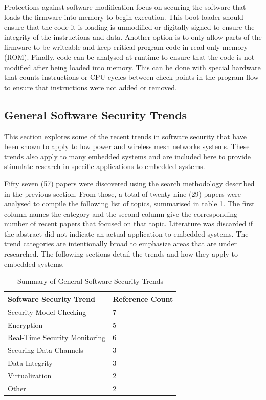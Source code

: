 \documentclass[final,conference,10pt]{IEEEtran}
\begin{document}
Protections against software modification focus on securing the software that loads the firmware into memory to begin execution.  This boot loader should ensure that the code it is loading is unmodified or digitally signed to ensure the integrity of the instructions and data. Another option is to only allow parts of the firmware to be writeable and keep critical program code in read only memory (ROM). Finally, code can be analysed at runtime to ensure that the code is not modified after being loaded into memory.  This can be done with special hardware that counts instructions or CPU cycles between check points in the program flow to ensure that instructions were not added or removed. \cite{compiler-hw approach,fpga-based}

\subsection{General Software Security Trends}

This section explores some of the recent trends in software security that have been shown to apply to low power and wireless mesh networks systems. These trends also apply to many embedded systems and are included here to provide stimulate research in specific applications to embedded systems.

Fifty seven (57) papers were discovered using the search methodology described in the previous section.  From those, a total of twenty-nine (29) papers were analysed to compile the following list of topics, summarised in table \ref{tab:trend_summary}.  The first column names the category and the second column give the corresponding number of recent papers that focused on that topic. Literature was discarded if the abstract did not indicate an actual application to embedded systems.  The trend categories are intentionally broad to emphasize areas that are under researched. The following sections detail  the trends and how they apply to embedded systems.

\begin{table}[!t]
\renewcommand{\arraystretch}{1.3}
\caption{Summary of General Software Security Trends}
\label{tab:trend_summary}
\centering
\begin{tabular}{ | l | l | }
\hline
 Software Security Trend & Reference Count \\ \hline
 Security Model Checking			& 7	\\ \hline
 Encryption						& 5	\\ \hline
 Real-Time Security Monitoring	& 6	\\ \hline
 Securing Data Channels			& 3	\\ \hline
 Data Integrity					& 3	\\ \hline
 Virtualization					& 2	\\ \hline	
 Other							& 2	\\ \hline
\end{tabular}
\end{table}
\end{document}
